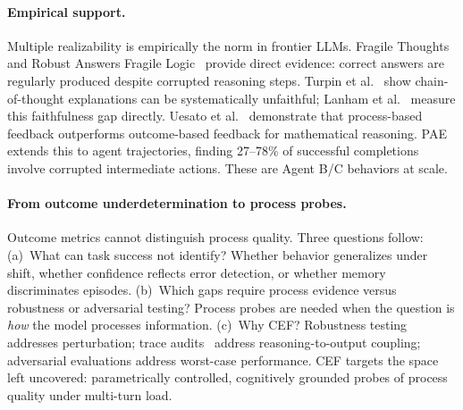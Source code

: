 \documentclass{article}
\begin{document}
\paragraph{Empirical support.}
Multiple realizability is empirically the norm in frontier LLMs.
Fragile Thoughts~\citep{aravindan2026fragile} and Robust Answers
Fragile Logic~\citep{jiang2026robustanswersfragilelogic} provide direct
evidence: correct answers are regularly produced despite corrupted
reasoning steps. Turpin et al.~\citep{turpin2023language} show
chain-of-thought explanations can be systematically unfaithful;
Lanham et al.~\citep{lanham2023measuring} measure this faithfulness
gap directly. Uesato et al.~\citep{uesato2022solving} demonstrate that
process-based feedback outperforms outcome-based feedback for
mathematical reasoning. PAE~\citep{xie2026m3} extends this to agent
trajectories, finding 27--78\% of successful completions involve
corrupted intermediate actions. These are Agent B/C behaviors at scale.

\paragraph{From outcome underdetermination to process probes.}
Outcome metrics cannot distinguish process quality. Three questions
follow: (a)~What can task success not identify? Whether behavior
generalizes under shift, whether confidence reflects error detection,
or whether memory discriminates episodes.
(b)~Which gaps require process evidence versus robustness or adversarial
testing? Process probes are needed when the question is \emph{how} the
model processes information.
(c)~Why CEF? Robustness testing~\citep{ribeiro2020checklist} addresses
perturbation; trace audits~\citep{turpin2023language,lanham2023measuring}
address reasoning-to-output coupling; adversarial evaluations address
worst-case performance. CEF targets the space left uncovered:
parametrically controlled, cognitively grounded probes of process quality
under multi-turn load.
\end{document}
